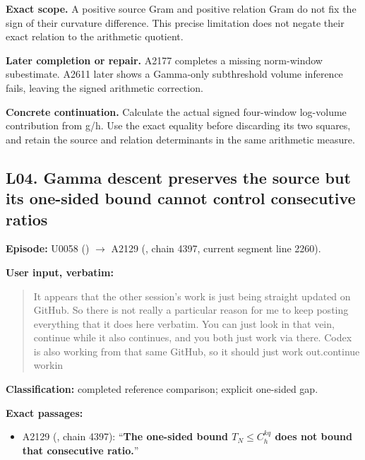 \documentclass[10pt,a4paper,oneside]{report}
\providecommand{\tightlist}{\setlength{\itemsep}{0pt}\setlength{\parskip}{0pt}}
\begin{document}
\textbf{Exact scope.} A positive source Gram and positive relation Gram
do not fix the sign of their curvature difference. This precise
limitation does not negate their exact relation to the arithmetic
quotient.

\textbf{Later completion or repair.} A2177 completes a missing
norm-window subestimate. A2611 later shows a Gamma-only subthreshold
volume inference fails, leaving the signed arithmetic correction.

\textbf{Concrete continuation.} Calculate the actual signed four-window
log-volume contribution from g/h. Use the exact equality before
discarding its two squares, and retain the source and relation
determinants in the same arithmetic measure.

\subsection{L04. Gamma descent preserves the source but its one-sided
bound cannot control consecutive
ratios}\label{l04.-gamma-descent-preserves-the-source-but-its-one-sided-bound-cannot-control-consecutive-ratios}

\textbf{Episode:} U0058
(\protect{})
\allowbreak{}\ensuremath{→}\allowbreak{} A2129
(\protect{}, chain 4397,
current segment line 2260).

\textbf{User input, verbatim:}

\begin{quote}
It appears that the other session's work is just being straight updated
on GitHub. So there is not really a particular reason for me to keep
posting everything that it does here verbatim. You can just look in that
vein, continue while it also continues, and you both just work via
there. Codex is also working from that same GitHub, so it should just
work out.continue workin
\end{quote}

\textbf{Classification:} completed reference comparison; explicit
one-sided gap.

\textbf{Exact passages:}

\begin{itemize}
\tightlist
\item
  A2129 (\protect{}, chain
  4397): ``\textbf{The one-sided bound \(T_N\le C_h^{kq}\) does not
  bound that consecutive ratio.}''
\end{itemize}
\end{document}

